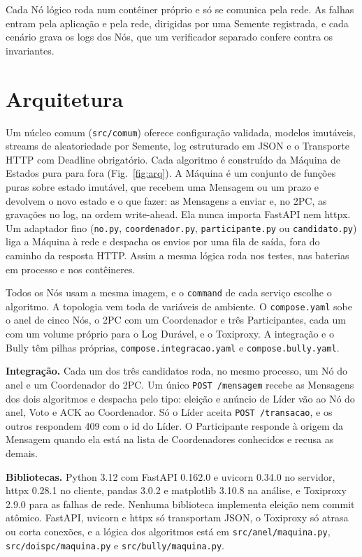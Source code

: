 \documentclass[conference]{IEEEtran}
\newcommand{\cod}[1]{\texttt{\upshape #1}}
\begin{document}
Cada Nó lógico roda num contêiner próprio e só se comunica pela rede. As falhas entram pela
aplicação e pela rede, dirigidas por uma Semente registrada, e cada cenário grava os logs dos Nós,
que um verificador separado confere contra os invariantes.

\section{Arquitetura}
\label{sec:arq}
Um núcleo comum (\cod{src/comum}) oferece configuração validada, modelos imutáveis, streams de
aleatoriedade por Semente, log estruturado em JSON e o Transporte HTTP com Deadline obrigatório.
Cada algoritmo é construído da Máquina de Estados pura para fora (Fig.~\ref{fig:arq}). A Máquina
é um conjunto de funções puras sobre estado imutável, que recebem uma Mensagem ou um prazo e
devolvem o novo estado e o que fazer: as Mensagens a enviar e, no 2PC, as gravações no log, na
ordem write-ahead. Ela nunca importa FastAPI nem httpx. Um adaptador fino (\cod{no.py},
\cod{coordenador.py}, \cod{participante.py} ou \cod{candidato.py}) liga a Máquina à rede e despacha
os envios por uma fila de saída, fora do caminho da resposta HTTP. Assim a mesma lógica roda nos
testes, nas baterias em processo e nos contêineres.

Todos os Nós usam a mesma imagem, e o \cod{command} de cada serviço escolhe o algoritmo. A
topologia vem toda de variáveis de ambiente. O \cod{compose.yaml} sobe o anel de cinco Nós, o 2PC
com um Coordenador e três Participantes, cada um com um volume próprio para o Log Durável, e o
Toxiproxy. A integração e o Bully têm pilhas próprias, \cod{compose.integracao.yaml} e
\cod{compose.bully.yaml}.

\textbf{Integração.} Cada um dos três candidatos roda, no mesmo processo, um Nó do anel e um
Coordenador do 2PC. Um único \cod{POST /mensagem} recebe as Mensagens dos dois algoritmos e
despacha pelo tipo: eleição e anúncio de Líder vão ao Nó do anel, Voto e ACK ao Coordenador. Só o
Líder aceita \cod{POST /transacao}, e os outros respondem 409 com o id do Líder. O Participante
responde à origem da Mensagem quando ela está na lista de Coordenadores conhecidos e recusa as
demais.

\textbf{Bibliotecas.} Python 3.12 com FastAPI 0.162.0 e uvicorn 0.34.0 no servidor, httpx 0.28.1
no cliente, pandas 3.0.2 e matplotlib 3.10.8 na análise, e Toxiproxy 2.9.0 para as falhas de rede.
Nenhuma biblioteca implementa eleição nem commit atômico. FastAPI, uvicorn e httpx só transportam
JSON, o Toxiproxy só atrasa ou corta conexões, e a lógica dos algoritmos está em
\cod{src/anel/maquina.py}, \cod{src/doispc/maquina.py} e \cod{src/bully/maquina.py}.
\end{document}
